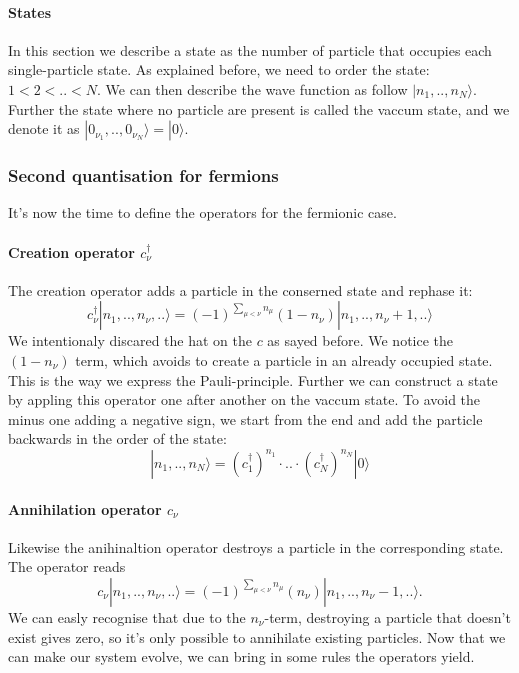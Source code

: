 \documentclass[../main.tex]{subfile}
\begin{document}
\paragraph{States} In this section we describe a state as the number of particle that occupies each single-particle state. As explained before, we need to
order the state: $1<2<..<N$. We can then describe the wave function as follow $|n_{1},..,n_{N}\rangle$.\\

Further the state where no particle are present is called the vaccum state, and we denote it as $|0_{\nu_1},..,0_{\nu_N}\rangle = |0\rangle$.

\subsubsection{Second quantisation for fermions}
It's now the time to define the operators for the fermionic case.
\paragraph{Creation operator $c_\nu^{\dagger}$}
The creation operator adds a particle in the conserned state and rephase it:
\[
    c_{\nu}^{\dagger} |n_{1},..,n_{\nu},..\rangle = (-1)^{\sum_{\mu<\nu}n_{\mu}} (1-n_{\nu})|n_{1},..,n_{\nu}+1,..\rangle
\]
We intentionaly discared the hat on the $c$ as sayed before.
We notice the $ (1-n_{\nu})$ term, which avoids to create a particle in an already occupied state. This is the way we express
the Pauli-principle. 
Further we can construct a state by appling this operator one after another on the vaccum state. To avoid the minus one adding a negative sign, we start from the 
end and add the particle backwards in the order of the state:
\[
    |n_{1},..,n_{N}\rangle = (c_{1}^{\dagger})^{n_{1}}\cdot ..\cdot (c_{N}^{\dagger})^{n_{N}} |0\rangle
\]  

\paragraph{Annihilation operator $c_\nu$}
Likewise the anihinaltion operator destroys a particle in the corresponding state. The operator reads
\[
    c_{\nu} |n_{1},..,n_{\nu},..\rangle = (-1)^{\sum_{\mu<\nu}n_{\mu}} (n_{\nu})|n_{1},..,n_{\nu}-1,..\rangle.
\]
We can easly recognise that due to the $n_{\nu}$-term, destroying a particle that doesn't exist gives zero, 
so it's only possible to annihilate existing particles. Now that we can make our system evolve, we can bring in some rules
the operators yield.
\end{document}
